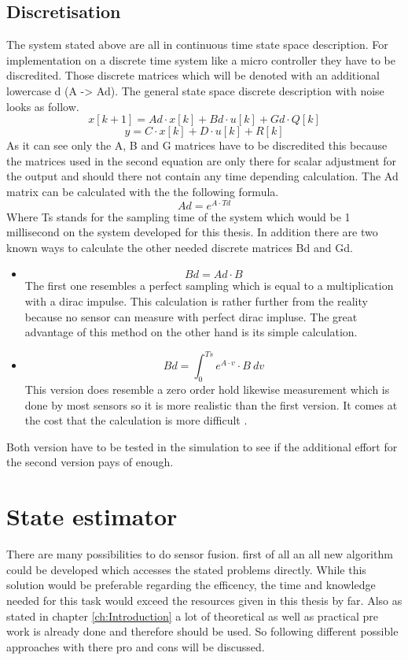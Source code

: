   \subsection{Discretisation}
  The system stated above are all in continuous time state space description. 
  For implementation on a discrete time system like a micro controller they have to be discredited.
  Those discrete matrices which will be denoted with an additional lowercase d (A -> Ad).
  The general state space discrete description with noise looks as follow.
  $$ x[k+1] = Ad\cdot x[k] + Bd\cdot u[k] + Gd\cdot Q[k] $$
  $$ y = C \cdot x[k] + D\cdot u[k] + R[k] $$
  As it can see only the A, B and G matrices have to be discredited this because 
  the matrices used in the second equation are only there for scalar adjustment for the output
  and should there not contain any time depending calculation.
  The Ad matrix can be calculated with the the following formula.
  $$ Ad = e^{A\cdot Td}$$
  Where Ts stands for the sampling time of the system which would be 1 millisecond on the system developed for this thesis.
  In addition there are two known ways to calculate the other needed discrete matrices Bd and Gd.
  \begin{itemize}
   \item $$ Bd = Ad \cdot B $$
	 The first one resembles a perfect sampling which is equal to a multiplication with a dirac impulse.
	 This calculation is rather further from the reality because no sensor can measure with perfect dirac impluse.
	 The great advantage of this method on the other hand is its simple calculation.
   \item $$ Bd = \int_0^{Ts} e^{A\cdot v}\cdot B \ dv $$
	 This version does resemble a zero order hold likewise measurement which is done by most sensors so it is more realistic than the first version.
	 It comes at the cost that the calculation is more difficult \cite{DavidWSchultz2004}.
  \end{itemize}

  Both version have to be tested in the simulation to see if the additional effort for the second version pays of enough.
  
  \section{State estimator}
  There are many possibilities to do sensor fusion. first of all an all new algorithm could be developed which accesses the 
  stated problems directly. While this solution would be preferable regarding the efficency, the 
  time and knowledge needed for this task would exceed the resources given in this thesis by far.
  Also as stated in chapter \ref{ch:Introduction} a lot of theoretical as well as practical pre work is
  already done and therefore should be used. 
  So following different possible approaches with there pro and cons will be discussed. 
  
